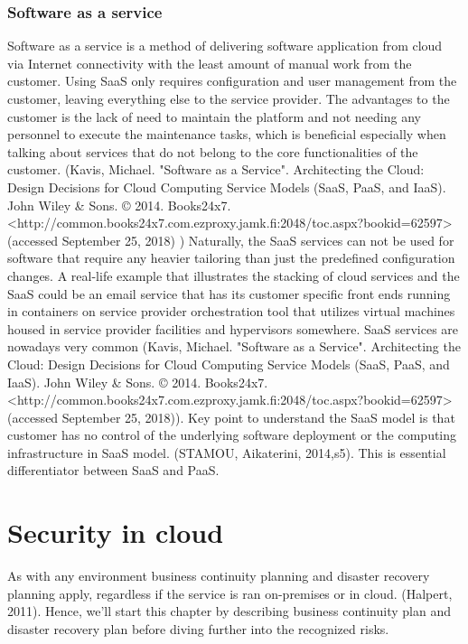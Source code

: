 \documentclass{article}
\begin{document}
\subsubsection{Software as a service}
Software as a service is a method of delivering software application from cloud via Internet connectivity with the least amount of manual work from the customer. Using SaaS only requires configuration and user management from the customer, leaving everything else to the service provider. The advantages to the customer is the lack of need to maintain the platform and not needing any personnel to execute the maintenance tasks, which is beneficial especially when talking about services that do not belong to the core functionalities of the customer. (Kavis, Michael. "Software as a Service". Architecting the Cloud: Design Decisions for Cloud Computing Service Models (SaaS, PaaS, and IaaS). John Wiley \& Sons. © 2014. Books24x7. <http://common.books24x7.com.ezproxy.jamk.fi:2048/toc.aspx?bookid=62597> (accessed September 25, 2018) ) Naturally, the SaaS services can not be used for software that require any heavier tailoring than just the predefined configuration changes.
A real-life example that illustrates the stacking of cloud services and the SaaS could be an email service that has its customer specific front ends running in containers on service provider orchestration tool that utilizes virtual machines housed in service provider facilities and hypervisors somewhere. SaaS services are nowadays very common (Kavis, Michael. "Software as a Service". Architecting the Cloud: Design Decisions for Cloud Computing Service Models (SaaS, PaaS, and IaaS). John Wiley \& Sons. © 2014. Books24x7. <http://common.books24x7.com.ezproxy.jamk.fi:2048/toc.aspx?bookid=62597> (accessed September 25, 2018)).
Key point to understand the SaaS model is that customer has no control of the underlying software deployment or the computing infrastructure in SaaS model. (STAMOU, Aikaterini, 2014,s5). This is essential differentiator between SaaS and PaaS.
\section{Security in cloud}
As with any environment business continuity planning and disaster recovery planning apply, regardless if the service is ran on-premises or in cloud. (Halpert, 2011).
Hence, we'll start this chapter by describing business continuity plan and disaster recovery plan before diving further into the recognized risks.
\end{document}
